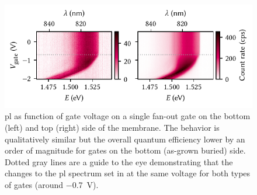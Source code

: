 \begin{figure}
    \centering
    \includegraphics{img/pdf/experiment/honey_H13_stark_shift_vs_gate}
    \caption[
        ,
        .
        \protect\newline
    ]{
        \Gls{pl} as function of gate voltage on a single fan-out gate on the bottom (left) and top (right) side of the membrane.
        The behavior is qualitatively similar but the overall quantum efficiency lower by an order of magnitude for gates on the bottom (as-grown buried) side.
        Dotted gray lines are a guide to the eye demonstrating that the changes to the \gls{pl} spectrum set in at the same voltage for both types of gates (around \qty{-0.7}{\volt}).
    }
    \label{fig:exp:pl:honey_H13_stark_shift_vs_gate}
\end{figure}

